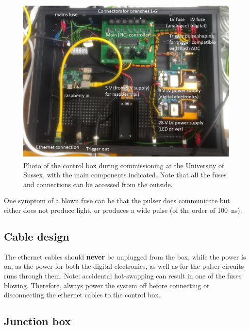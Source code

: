 \begin{figure}
\begin{center}	
  \includegraphics[width=0.75\linewidth]{figures/controlbox.jpg}
  \caption{Photo of the control box during commissioning at the University of Sussex, with the main components indicated. Note that all the fuses and connections can be accessed from the outside.}
  \label{figure:controlbox}
\end{center}
\end{figure}

One symptom of a blown fuse can be that  the pulser does communicate but either does not produce light, or produces a wide pulse (of the order of 100~ns).

\subsection*{Cable design}

The ethernet cables should {\bf never} be unplugged from the box, while the power is on, as the power for both the digital electronics, as well as for the pulser circuits runs through them. Note: accidental hot-swapping can result in one of the fuses blowing. Therefore, always power the system off before connecting or disconnecting the ethernet cables to the control box.

\subsection*{Junction box}

